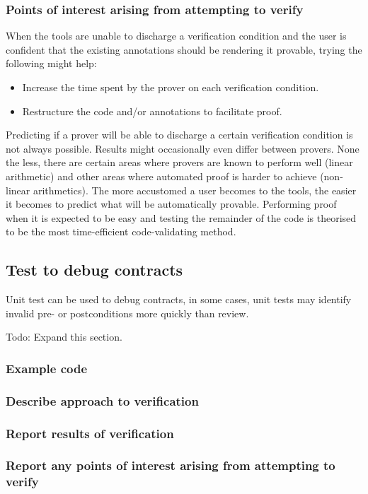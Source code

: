 \documentclass{llncs}
\begin{document}
\subsubsection{Points of interest arising from attempting to verify}
When the tools are unable to discharge a verification condition and
the user is confident that the existing annotations should be
rendering it provable, trying the following might help:
\begin{itemize}
\item Increase the time spent by the prover on each verification
  condition.
\item Restructure the code and/or annotations to facilitate proof.
\end{itemize}

Predicting if a prover will be able to discharge a certain
verification condition is not always possible. Results might
occasionally even differ between provers. None the less, there are
certain areas where provers are known to perform well (linear
arithmetic) and other areas where automated proof is harder to
achieve (non-linear arithmetics). The more accustomed a user becomes
to the tools, the easier it becomes to predict what will be
automatically provable. Performing proof when it is expected to be
easy and testing the remainder of the code is theorised to be the most
time-efficient code-validating method.

\subsection{Test to debug contracts}
Unit test can be used to debug contracts, in some cases, unit tests
may identify invalid pre- or postconditions more quickly than review.

Todo: Expand this section.

\subsubsection{Example code}
\subsubsection{Describe approach to verification}
\subsubsection{Report results of verification}
\subsubsection{Report any points of interest arising from attempting to verify}
\end{document}
